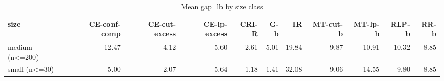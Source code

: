\begin{table}[htbp]
\centering
\small
\caption{Mean gap\_lb by size class}
\label{tab:E2b_head_to_head_budgets_b10_by_size}
\begin{tabular}{lrrrrrrrrrr}
\toprule
size & CE-conf-comp & CE-cut-excess & CE-lp-excess & CRI-R & G-b & IR & MT-cut-b & MT-lp-b & RLP-b & RR-b \\
\midrule
medium (n<=200) & 12.47 & 4.12 & 5.60 & 2.61 & 5.01 & 19.84 & 9.87 & 10.91 & 10.32 & 8.85 \\
small (n<=30) & 5.00 & 2.07 & 5.64 & 1.18 & 1.41 & 32.08 & 9.06 & 14.55 & 9.80 & 8.85 \\
\bottomrule
\end{tabular}
\end{table}
